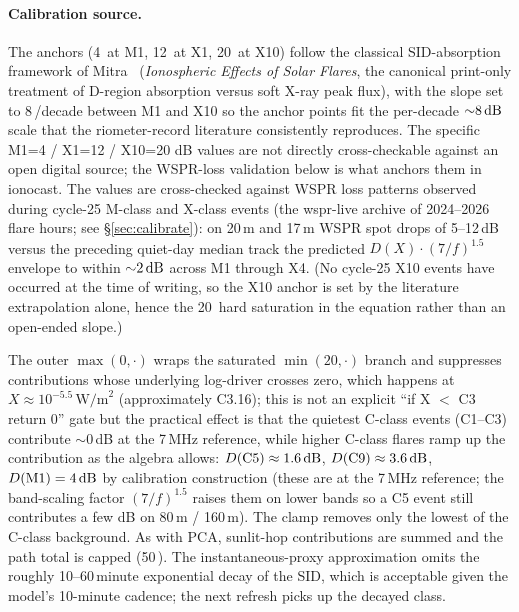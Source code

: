 \documentclass[11pt,a4paper]{article}
\newcommand{\SI}[2]{#1\,\text{#2}}
\newcommand{\si}[1]{\text{#1}}
\newcommand{\dB}{\text{dB}}
\begin{document}
\paragraph{Calibration source.}  The anchors (\SI{4}{\dB} at M1,
\SI{12}{\dB} at X1, \SI{20}{\dB} at X10) follow the classical
SID-absorption framework of Mitra~\cite{mitra1974}
(\emph{Ionospheric Effects of Solar Flares}, the canonical
print-only treatment of D-region absorption versus soft X-ray
peak flux), with the slope set to \SI{8}{\dB}/decade between M1
and X10 so the anchor points fit the per-decade ${\sim}8\,\si{\dB}$
scale that the riometer-record literature consistently
reproduces.  The specific M1=4 / X1=12 / X10=20 dB values are
not directly cross-checkable against an open digital source;
the WSPR-loss validation below is what anchors them in
ionocast. The values are cross-checked against WSPR loss
patterns observed during cycle-25 M-class and X-class events (the
wspr-live archive of 2024--2026 flare hours; see
\S\ref{sec:calibrate}): on 20\,m and 17\,m WSPR spot drops of
5--12\,dB versus the preceding quiet-day median track the predicted
$D(X) \cdot (7/f)^{1.5}$ envelope to within ${\sim}\SI{2}{\dB}$
across M1 through X4. (No cycle-25 X10 events have occurred at
the time of writing, so the X10 anchor is set by the literature
extrapolation alone, hence the \SI{20}{\dB} hard saturation in
the equation rather than an open-ended slope.)

The outer $\max(0, \cdot)$ wraps the saturated $\min(20, \cdot)$
branch and suppresses contributions whose underlying log-driver
crosses zero, which happens at $X \approx 10^{-5.5}\,\text{W/m}^{2}$
(approximately C3.16); this is not an explicit ``if X $<$ C3
return 0'' gate but the practical effect is that the quietest
C-class events (C1--C3) contribute
$\sim$0\,dB at the 7\,MHz reference, while higher C-class flares
ramp up the contribution as the algebra allows:
$D(\text{C5}) \approx \SI{1.6}{\dB}$,
$D(\text{C9}) \approx \SI{3.6}{\dB}$,
$D(\text{M1}) = \SI{4}{\dB}$ by calibration construction (these
are at the 7\,MHz reference; the band-scaling factor
$(7/f)^{1.5}$ raises them on lower bands so a C5 event still
contributes a few dB on 80\,m / 160\,m).  The clamp removes only
the lowest of the C-class background.  As with PCA, sunlit-hop
contributions are summed and
the path total is capped (\SI{50}{\dB}).  The instantaneous-proxy
approximation omits the roughly 10--60\,minute exponential decay
of the SID, which is acceptable given the model's 10-minute
cadence; the next refresh picks up the decayed class.
\end{document}
